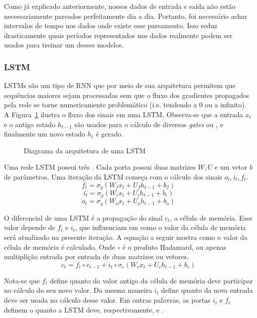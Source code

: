 Como já explicado anteriormente, nossos dados de entrada e saída não estão necessariamente pareados perfeitamente dia a dia. Portanto, foi necessário achar intervalos de tempo nos dados onde existe esse pareamento. Isso reduz drasticamente quais períodos representados nos dados realmente podem ser usados para treinar um desses modelos.


\subsubsection{LSTM}
\label{sec:lstm}

LSTMs \citep{lstm} são um tipo de RNN que por meio de sua arquitetura permitem que sequências
maiores sejam processadas sem que o fluxo dos gradientes propagados pela rede se torne
numericamente problemático (i.e. tendendo a 0 ou a infinito). A
Figura~\ref{fig:lstm} ilustra o fluxo dos sinais em uma LSTM. Observa-se que a
entrada $x_t$ e o antigo estado $h_{t-1}$ são usados para o cálculo de diversos \textit{gates} ou , e
finalmente um novo estado $h_t$ é gerado.\\

\begin{figure}
\centering
\caption{Diagrama da arquitetura de uma LSTM}

\label{fig:lstm}
\end{figure}




Uma rede LSTM possui três . Cada porta possui duas matrizes $W,U$ e um
vetor $b$ de parâmetros. Uma iteração da LSTM começa com o cálculo dos sinais
$o_t,i_t,f_t$.\\

\[f_t = \sigma_g(W_fx_t + U_fh_{t-1} + b_f)\]
\[i_t = \sigma_g(W_ix_t + U_ih_{t-1} + b_i)\]
\[o_t = \sigma_g(W_ox_t + U_oh_{t-1} + b_o)\]

O diferencial de uma LSTM é a propagação do sinal $c_t$, a célula de memória.
Esse valor depende de $f_t$ e $i_t$, que influenciam em como o valor da
célula de memória será atualizado na presente iteração. A equação a seguir
mostra como o valor da célula de memória é calculado. Onde $\circ$ é o produto Hadamard, ou apenas multiplição entrada por entrada de
duas matrizes ou vetores. \\

\[c_t = f_t \circ c_{t-1} + i_t \circ \sigma_c(W_cx_t + U_ch_{t-1} + b_c)\]

Nota-se que $f_t$
define quanto do valor antigo da célula de memória deve participar no cálculo do
seu novo valor. 
Da mesma maneira $i_t$ define quanto da nova entrada deve ser usada no cálculo desse valor.
Em outras palavras, as portas $i_t$ e $f_t$ definem o quanto a LSTM deve,
respectivamente,  e .


